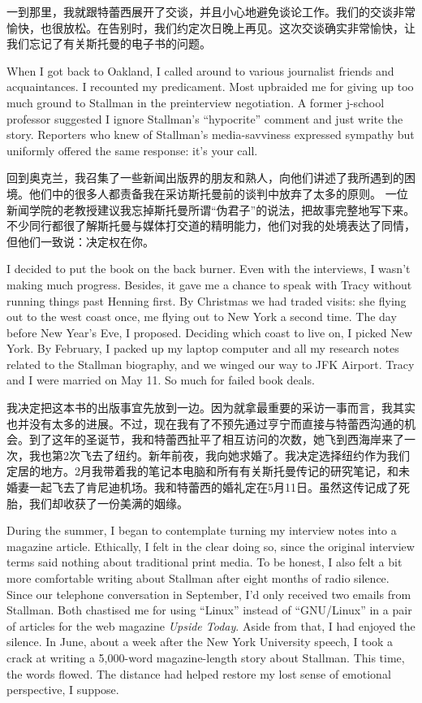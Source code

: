 \ifdefined\chs
一到那里，我就跟特蕾西展开了交谈，并且小心地避免谈论工作。我们的交谈非常愉快，也很放松。在告别时，我们约定次日晚上再见。这次交谈确实非常愉快，让我们忘记了有关斯托曼的电子书的问题。
\fi

\ifdefined\eng
When I got back to Oakland, I called around to various journalist friends and acquaintances. I recounted my predicament. Most upbraided me for giving up too much ground to Stallman in the preinterview negotiation.
\ifdefined{}
\fi
A former j-school professor suggested I ignore Stallman's ``hypocrite'' comment and just write the story. Reporters who knew of Stallman's media-savviness expressed sympathy but uniformly offered the same response: it's your call.
\fi

\ifdefined\chs
回到奥克兰，我召集了一些新闻出版界的朋友和熟人，向他们讲述了我所遇到的困境。他们中的很多人都责备我在采访斯托曼前的谈判中放弃了太多的原则。
\ifdefined\vtwo
\fi
一位新闻学院的老教授建议我忘掉斯托曼所谓``伪君子''的说法，把故事完整地写下来。不少同行都很了解斯托曼与媒体打交道的精明能力，他们对我的处境表达了同情，但他们一致说：决定权在你。
\fi

\ifdefined\eng
I decided to put the book on the back burner. Even with the interviews, I wasn't making much progress. Besides, it gave me a chance to speak with Tracy without running things past Henning first. By Christmas we had traded visits: she flying out to the west coast once, me flying out to New York a second time. The day before New Year's Eve, I proposed. Deciding which coast to live on, I picked New York. By February, I packed up my laptop computer and all my research notes related to the Stallman biography, and we winged our way to JFK Airport. Tracy and I were married on May 11. So much for failed book deals.
\fi

\ifdefined\chs
我决定把这本书的出版事宜先放到一边。因为就拿最重要的采访一事而言，我其实也并没有太多的进展。不过，现在我有了不预先通过亨宁而直接与特蕾西沟通的机会。到了这年的圣诞节，我和特蕾西扯平了相互访问的次数，她飞到西海岸来了一次，我也第2次飞去了纽约。新年前夜，我向她求婚了。我决定选择纽约作为我们定居的地方。2月我带着我的笔记本电脑和所有有关斯托曼传记的研究笔记，和未婚妻一起飞去了肯尼迪机场。我和特蕾西的婚礼定在5月11日。虽然这传记成了死胎，我们却收获了一份美满的姻缘。
\fi

\ifdefined\eng
During the summer, I began to contemplate turning my interview notes into a magazine article. Ethically, I felt in the clear doing so, since the original interview terms said nothing about traditional print media. To be honest, I also felt a bit more comfortable writing about Stallman after eight months of radio silence. Since our telephone conversation in September, I'd only received two emails from Stallman. Both chastised me for using ``Linux'' instead of ``GNU/Linux'' in a pair of articles for the web magazine \textit{Upside Today}. Aside from that, I had enjoyed the silence. In June, about a week after the New York University speech, I took a crack at writing a 5,000-word magazine-length story about Stallman. This time, the words flowed. The distance had helped restore my lost sense of emotional perspective, I suppose.
\fi

